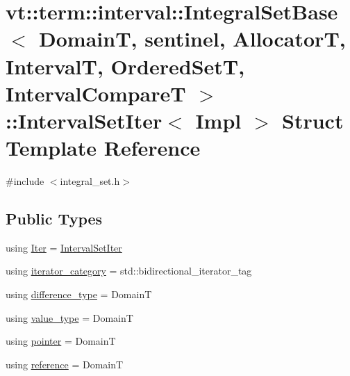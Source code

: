 \hypertarget{structvt_1_1term_1_1interval_1_1_integral_set_base_1_1_interval_set_iter}{}\section{vt\+:\+:term\+:\+:interval\+:\+:Integral\+Set\+Base$<$ DomainT, sentinel, AllocatorT, IntervalT, Ordered\+SetT, Interval\+CompareT $>$\+:\+:Interval\+Set\+Iter$<$ Impl $>$ Struct Template Reference}
\label{structvt_1_1term_1_1interval_1_1_integral_set_base_1_1_interval_set_iter}


{\ttfamily \#include $<$integral\+\_\+set.\+h$>$}

\subsection*{Public Types}
\begin{DoxyCompactItemize}
\item 
using \hyperlink{structvt_1_1term_1_1interval_1_1_integral_set_base_1_1_interval_set_iter_a4056b2dcca9f60143d2d76387599e6e1}{Iter} = \hyperlink{structvt_1_1term_1_1interval_1_1_integral_set_base_1_1_interval_set_iter}{Interval\+Set\+Iter}
\item 
using \hyperlink{structvt_1_1term_1_1interval_1_1_integral_set_base_1_1_interval_set_iter_a50527fe18f4660916ae341f4d06b40d4}{iterator\+\_\+category} = std\+::bidirectional\+\_\+iterator\+\_\+tag
\item 
using \hyperlink{structvt_1_1term_1_1interval_1_1_integral_set_base_1_1_interval_set_iter_aba8b3805fbc28a4fbb78cad61e0f2ed4}{difference\+\_\+type} = DomainT
\item 
using \hyperlink{structvt_1_1term_1_1interval_1_1_integral_set_base_1_1_interval_set_iter_abc7b9a7a287957cc11f7f8679084fad8}{value\+\_\+type} = DomainT
\item 
using \hyperlink{structvt_1_1term_1_1interval_1_1_integral_set_base_1_1_interval_set_iter_a9da8b4820369a4e830f6ca596e08270c}{pointer} = DomainT
\item 
using \hyperlink{structvt_1_1term_1_1interval_1_1_integral_set_base_1_1_interval_set_iter_a59b5e1223198deaeacb85051517dd80a}{reference} = DomainT
\end{DoxyCompactItemize}
